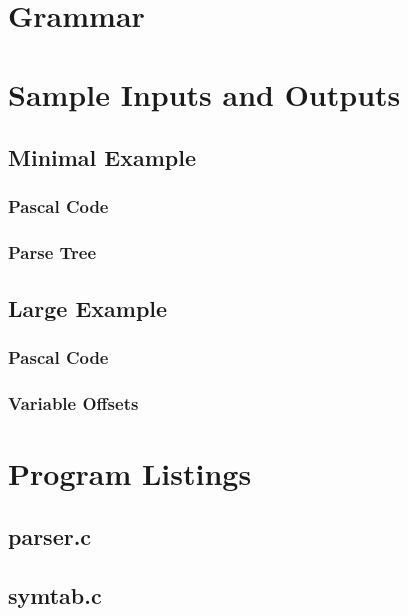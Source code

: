 \documentclass[titlepage]{article}
\begin{document}
	\section{Grammar}
		
	\section{Sample Inputs and Outputs}
		\subsection{Minimal Example}
		\begin{minipage}[t]{0.5\textwidth}
			\subsubsection{Pascal Code}
			
		\end{minipage}
		\begin{minipage}[t]{0.5\textwidth}
			\subsubsection{Parse Tree}
			
		\end{minipage}
		\subsection{Large Example}
		\begin{minipage}[t]{0.5\textwidth}
			\subsubsection{Pascal Code}
			
		\end{minipage}
		\begin{minipage}[t]{0.5\textwidth}
			\subsubsection{Variable Offsets}
			
		\end{minipage}
	\section{Program Listings}
		\subsection{parser.c}
		
		\subsection{symtab.c}
		
\end{document}
